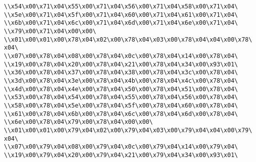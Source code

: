 \verb|\\x54\x00\x71\x04\x55\x00\x71\x04\x56\x00\x71\x04\x58\x00\x71\x04\|\newline
\verb|\\x5e\x00\x71\x04\x5f\x00\x71\x04\x60\x00\x71\x04\x61\x00\x71\x04\|\newline
\verb|\\x6b\x00\x71\x04\x6c\x00\x71\x04\x6d\x00\x71\x04\x6e\x00\x71\x04\|\newline
\verb|\\x79\x00\x71\x04\x00\x00\|\newline
\verb|\\x01\x00\x01\x00\x78\x04\x02\x00\x78\x04\x03\x00\x78\x04\x04\x00\x78\x04\|\newline
\verb|\\x07\x00\x78\x04\x08\x00\x78\x04\x0c\x00\x78\x04\x14\x00\x78\x04\|\newline
\verb|\\x19\x00\x78\x04\x20\x00\x78\x04\x21\x00\x78\x04\x34\x00\x93\x01\|\newline
\verb|\\x36\x00\x78\x04\x37\x00\x78\x04\x38\x00\x78\x04\x3c\x00\x78\x04\|\newline
\verb|\\x3d\x00\x78\x04\x3e\x00\x78\x04\x4b\x00\x78\x04\x4c\x00\x78\x04\|\newline
\verb|\\x4d\x00\x78\x04\x4e\x00\x78\x04\x50\x00\x78\x04\x51\x00\x78\x04\|\newline
\verb|\\x53\x00\x78\x04\x54\x00\x78\x04\x55\x00\x78\x04\x56\x00\x78\x04\|\newline
\verb|\\x58\x00\x78\x04\x5e\x00\x78\x04\x5f\x00\x78\x04\x60\x00\x78\x04\|\newline
\verb|\\x61\x00\x78\x04\x6b\x00\x78\x04\x6c\x00\x78\x04\x6d\x00\x78\x04\|\newline
\verb|\\x6e\x00\x78\x04\x79\x00\x78\x04\x00\x00\|\newline
\verb|\\x01\x00\x01\x00\x79\x04\x02\x00\x79\x04\x03\x00\x79\x04\x04\x00\x79\x04\|\newline
\verb|\\x07\x00\x79\x04\x08\x00\x79\x04\x0c\x00\x79\x04\x14\x00\x79\x04\|\newline
\verb|\\x19\x00\x79\x04\x20\x00\x79\x04\x21\x00\x79\x04\x34\x00\x93\x01\|\newline
